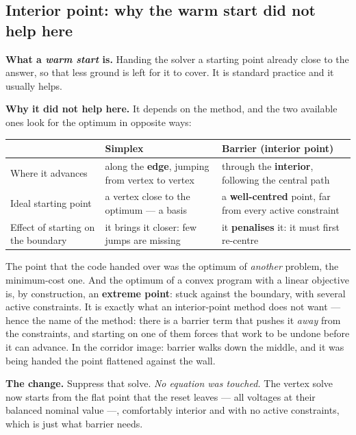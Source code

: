 \documentclass[11pt,a4paper]{article}
\begin{document}
\subsection{Interior point: why the warm start did not help here}

\textbf{What a \emph{warm start} is.} Handing the solver a starting point already close to the
answer, so that less ground is left for it to cover. It is standard practice and it usually helps.

\textbf{Why it did not help here.} It depends on the method, and the two available ones look for the
optimum in opposite ways:

\begin{center}\small
\begin{tabular}{@{}p{} p{} p{}@{}}
\toprule
& \textbf{Simplex} & \textbf{Barrier (interior point)}\\
\midrule
Where it advances & along the \textbf{edge}, jumping from vertex to vertex & through the
\textbf{interior}, following the central path\\
\addlinespace[2pt]
Ideal starting point & a vertex close to the optimum --- a basis & a \textbf{well-centred} point,
far from every active constraint\\
\addlinespace[2pt]
Effect of starting on the boundary & it brings it closer: few jumps are missing & it
\textbf{penalises} it: it must first re-centre\\
\bottomrule
\end{tabular}
\end{center}

The point that the code handed over was the optimum of \emph{another} problem, the minimum-cost one.
And the optimum of a convex program with a linear objective is, by construction, an \textbf{extreme
point}: stuck against the boundary, with several active constraints. It is exactly what an
interior-point method does not want --- hence the name of the method: there is a barrier term that
pushes it \emph{away} from the constraints, and starting on one of them forces that work to be
undone before it can advance. In the corridor image: barrier walks down the middle, and it was being
handed the point flattened against the wall.

\textbf{The change.} Suppress that solve. \emph{No equation was touched.} The vertex solve now
starts from the flat point that the reset leaves --- all voltages at their balanced nominal value
---, comfortably interior and with no active constraints, which is just what barrier needs.
\end{document}
